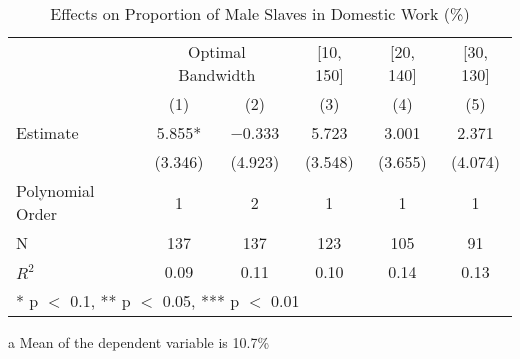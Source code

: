 \begin{table}[!h]

\caption{Effects on Proportion of Male Slaves in Domestic Work (\%) \label{tab:rdd_enslaved_domestic_men}}
\centering
\begin{threeparttable}
\begin{tabular}[t]{lccccc}
\toprule
\multicolumn{1}{c}{} & \multicolumn{2}{c}{Optimal Bandwidth} & \multicolumn{1}{c}{[10, 150]} & \multicolumn{1}{c}{[20, 140]} & \multicolumn{1}{c}{[30, 130]} \\
\cmidrule(l{3pt}r{3pt}){2-3} \cmidrule(l{3pt}r{3pt}){4-4} \cmidrule(l{3pt}r{3pt}){5-5} \cmidrule(l{3pt}r{3pt}){6-6}
  & (1) & (2) & (3) & (4) & (5)\\
\midrule
Estimate & \num{5.855}* & \num{-0.333} & \num{5.723} & \num{3.001} & \num{2.371}\\
 & (\num{3.346}) & (\num{4.923}) & (\num{3.548}) & (\num{3.655}) & (\num{4.074})\\

\midrule
Polynomial Order & 1 & 2 & 1 & 1 & 1\\
N & \num{137} & \num{137} & \num{123} & \num{105} & \num{91}\\
$R^2$ & \num{0.09} & \num{0.11} & \num{0.10} & \num{0.14} & \num{0.13}\\
\bottomrule
\multicolumn{6}{l}{\rule{0pt}{1em}* p $<$ 0.1, ** p $<$ 0.05, *** p $<$ 0.01}\\
\end{tabular}
\begin{tablenotes}
\item[a] Mean of the dependent variable is 10.7\%
\end{tablenotes}
\end{threeparttable}
\end{table}
